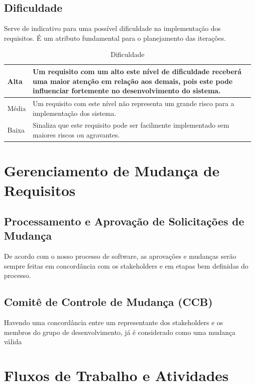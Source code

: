 \subsection{Dificuldade}

Serve de indicativo para uma possível dificuldade na implementação dos requisitos. É um atributo fundamental para o planejamento das iterações.

\begin{table}[!h]
\centering
\caption{Dificuldade}
\label{attr_Dificuldade}
\begin{tabular}{|p{2cm}|p{8cm}|}
\hline
Alta  & Um requisito com um alto este nível de dificuldade receberá uma maior atenção em relação aos demais, pois este pode influenciar fortemente no desenvolvimento do sistema. \\ \hline
Média & Um requisito com este nível não representa um grande risco para a implementação dos sistema.                                                                              \\ \hline
Baixa & Sinaliza que este requisito pode ser facilmente implementado sem maiores riscos ou agravantes.                                                                            \\ \hline
\end{tabular}
\end{table}

\section{Gerenciamento de Mudança de Requisitos}

\subsection{Processamento e Aprovação de Solicitações de Mudança}

De acordo com o nosso processo de software, as aprovações e mudanças serão sempre feitas em concordância com os stakeholders e em etapas bem definidas do processo.

\subsection{Comitê de Controle de Mudança (CCB)}

Havendo uma concordância entre um representante dos stakeholders e os membros do grupo de desenvolvimento, já é considerado como uma mudança válida

\section{Fluxos de Trabalho e Atividades}

